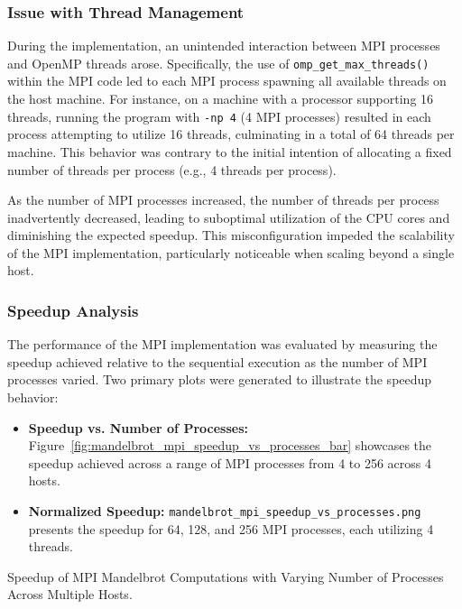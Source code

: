 \documentclass[
	report, %
	11pt, %
]{CSUniSchoolLabReport}
\newcounter{ct}
\begin{document}
\subsubsection{Issue with Thread Management}

During the implementation, an unintended interaction between MPI processes and OpenMP threads arose. Specifically, the use of \texttt{omp\_get\_max\_threads()} within the MPI code led to each MPI process spawning all available threads on the host machine. For instance, on a machine with a processor supporting 16 threads, running the program with \texttt{-np 4} (4 MPI processes) resulted in each process attempting to utilize 16 threads, culminating in a total of 64 threads per machine. This behavior was contrary to the initial intention of allocating a fixed number of threads per process (e.g., 4 threads per process).

As the number of MPI processes increased, the number of threads per process inadvertently decreased, leading to suboptimal utilization of the CPU cores and diminishing the expected speedup. This misconfiguration impeded the scalability of the MPI implementation, particularly noticeable when scaling beyond a single host.

\subsubsection{Speedup Analysis}

The performance of the MPI implementation was evaluated by measuring the speedup achieved relative to the sequential execution as the number of MPI processes varied. Two primary plots were generated to illustrate the speedup behavior:

\begin{itemize}
	\item \textbf{Speedup vs. Number of Processes:} Figure~\ref{fig:mandelbrot_mpi_speedup_vs_processes_bar} showcases the speedup achieved across a range of MPI processes from 4 to 256 across 4 hosts.
	\item \textbf{Normalized Speedup:} \texttt{mandelbrot\_mpi\_speedup\_vs\_processes.png} presents the speedup for 64, 128, and 256 MPI processes, each utilizing 4 threads.
\end{itemize}

\begin{table}[H]
	\centering
	\captionsetup{justification=centering, width=.8\linewidth}
	
	\caption{Speedup of MPI Mandelbrot Computations with Varying Number of Processes Across Multiple Hosts.}
	\label{tab:mandelbrot_mpi_speedup_vs_processes}
\end{table}
\end{document}
